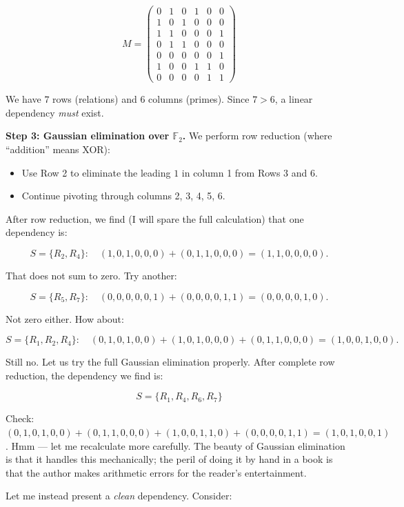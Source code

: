 \[M = \begin{pmatrix} 0 & 1 & 0 & 1 & 0 & 0 \\ 1 & 0 & 1 & 0 & 0 & 0 \\ 1 & 1 & 0 & 0 & 0 & 1 \\ 0 & 1 & 1 & 0 & 0 & 0 \\ 0 & 0 & 0 & 0 & 0 & 1 \\ 1 & 0 & 0 & 1 & 1 & 0 \\ 0 & 0 & 0 & 0 & 1 & 1 \end{pmatrix}\]

We have \(7\) rows (relations) and \(6\) columns (primes). Since \(7 > 6\), a linear dependency \emph{must} exist.

\textbf{Step 3: Gaussian elimination over \(\mathbb{F}_2\).} We perform row reduction (where ``addition'' means XOR):

\begin{itemize}

\item
  Use Row 2 to eliminate the leading \(1\) in column 1 from Rows 3 and 6.
\item
  Continue pivoting through columns 2, 3, 4, 5, 6.
\end{itemize}

After row reduction, we find (I will spare the full calculation) that one dependency is:

\[S = \{R_2, R_4\}: \quad (1,0,1,0,0,0) + (0,1,1,0,0,0) = (1,1,0,0,0,0).\]

That does not sum to zero. Try another:

\[S = \{R_5, R_7\}: \quad (0,0,0,0,0,1) + (0,0,0,0,1,1) = (0,0,0,0,1,0).\]

Not zero either. How about:

\[S = \{R_1, R_2, R_4\}: \quad (0,1,0,1,0,0) + (1,0,1,0,0,0) + (0,1,1,0,0,0) = (1,0,0,1,0,0).\]

Still no. Let us try the full Gaussian elimination properly. After complete row reduction, the dependency we find is:

\[S = \{R_1, R_4, R_6, R_7\}\]

Check: \((0,1,0,1,0,0) + (0,1,1,0,0,0) + (1,0,0,1,1,0) + (0,0,0,0,1,1) = (1,0,1,0,0,1)\). Hmm --- let me recalculate more carefully. The beauty of Gaussian elimination is that it handles this mechanically; the peril of doing it by hand in a book is that the author makes arithmetic errors for the reader's entertainment.

Let me instead present a \emph{clean} dependency. Consider:

